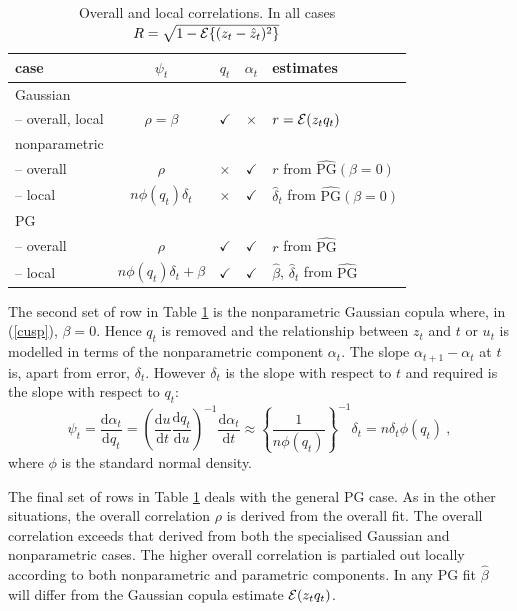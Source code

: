 \documentclass[authoryear]{elsarticle}
\newcommand{\Ex}{{\cal E}}
\newcommand{\de}{\mathrm{d}}
\newcommand{\eref}[1]{(\ref{#1})}
\newcommand{\tref}[1]{Table \ref{#1}}
\newcommand{\be}[1]{\begin{equation}\label{#1}}
\newcommand{\ee}{\end{equation}}
\begin{document}
\begin{table}[htdp]
\caption{Overall and local correlations.  In all cases $R=\sqrt{1-\Ex\{(z_t-\hat z_t)^2\}}$}\label{corr}
\begin{center}
\begin{tabular}{l|ccc|l}
\hline
case & $\psi_t$ & $q_t$ & $\alpha_t$ & estimates\\
\hline\hline
Gaussian & & & \\
-- overall,  local &$\rho=\beta$ &$\checkmark$& $\times$ & $r=\Ex(z_tq_t)$ \\
\hline
nonparametric & & & \\
-- overall &$\rho$ &$\times$ & $\checkmark$& $r$ from $\widehat{\mathrm{PG}}(\beta=0)$\\
-- local  &$n\phi(q_t)\delta_t$ &$\times$ & $\checkmark$& $\hat\delta_t$ from $\widehat{\mathrm{PG}}(\beta=0)$\\
\hline
PG & & & \\
-- overall & $\rho$ & $\checkmark$& $\checkmark$& $r$ from $\widehat{\mathrm{PG}}$ \\
-- local & $n\phi(q_t)\delta_t+\beta$&$\checkmark$& $\checkmark$&$\hat\beta$, $\hat\delta_t$ from $\widehat{\mathrm{PG}}$  \\
\hline\hline
\end{tabular}
\end{center}
\end{table}%

The second set of row in \tref{corr} is the nonparametric Gaussian copula where, in \eref{cusp},  $\beta=0$.  Hence $q_t$ is removed and  the relationship between $z_t$ and $t$ or $u_t$ is  modelled in terms of the  nonparametric component $\alpha_t$.  The   slope $\alpha_{t+1}-\alpha_t$  at  $t$ is, apart from error,
$\delta_t$.   However $\delta_t$ is the slope with respect to $t$ and required is the slope with respect to $q_t$:
\be{normslope}
\psi_t=\frac{\de \alpha_t}{\de q_t} = \left( \frac{\de u}{\de t}\frac{\de q_t}{\de u}\right)^{-1}\frac{\de \alpha_t}{\de t}  \approx
\left\{\frac{1}{n\phi(q_t)}\right\}^{-1}\delta_t  = n\delta_t\phi(q_t)\ ,
\ee
where $\phi$ is the standard normal density.    

The final set of rows in \tref{corr} deals with the general PG case.   As in the other situations, the overall correlation $\rho$ is derived from the overall fit.   The overall correlation exceeds that derived from both the specialised Gaussian and nonparametric cases.   The higher overall correlation is partialed out locally according to both nonparametric and parametric components.   In any PG fit $\hat\beta$ will differ from the Gaussian copula estimate $\Ex(z_tq_t)$.  
\end{document}
